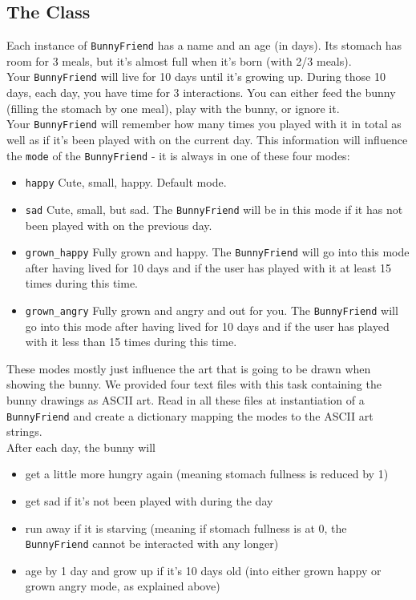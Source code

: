 \subsection{The Class}
Each instance of \texttt{BunnyFriend} has a name and an age (in days). Its
stomach has room for 3 meals, but it's almost full when it's born (with 2/3 meals).\\
Your \texttt{BunnyFriend} will live for 10 days until it's growing up. During those 10\\
days, each day, you have time for 3 interactions. You can either feed the bunny (filling
the stomach by one meal), play with the bunny, or ignore it.\\
Your \texttt{BunnyFriend} will remember how many times you played with it in total as well
as if it's been played with on the current day. This information will influence the
\texttt{mode} of the \texttt{BunnyFriend} - it is always in one of these four modes:
\begin{itemize}
	\item \texttt{happy} Cute, small, happy. Default mode.
	\item \texttt{sad} Cute, small, but sad. The \texttt{BunnyFriend} will be in this mode if it has not
	been played with on the previous day.
	\item \texttt{grown\_happy} Fully grown and happy. The \texttt{BunnyFriend} will go into this mode after
	having lived for 10 days and if the user has played with it at least 15 times during this time.
	\item \texttt{grown\_angry} Fully grown and angry and out for you. The \texttt{BunnyFriend} will go into this mode
	after having lived for 10 days and if the user has played with it less than 15 times during this time.
\end{itemize}
These modes mostly just influence the art that is going to be drawn when showing the bunny. We provided
four text files with this task containing the bunny drawings as ASCII art. Read in all these files at instantiation
of a \texttt{BunnyFriend} and create a dictionary mapping the modes to the ASCII art strings.
\\

\noindent After each day, the bunny will
\begin{itemize}
\item get a little more hungry again (meaning stomach fullness is reduced by 1)
\item get sad if it's not been played with during the day
\item run away if it is starving (meaning if stomach fullness is at 0, the \texttt{BunnyFriend} cannot be interacted with any longer)
\item age by 1 day and grow up if it's 10 days old (into either grown happy or grown angry mode, as explained above)
\end{itemize}

